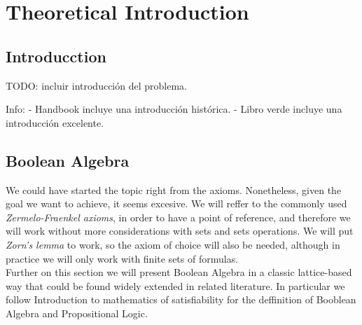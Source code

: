 
\chapter{Theoretical Introduction} %

\label{Chapter1} %


\newcommand{\keyword}[1]{\textbf{#1}}
\newcommand{\tabhead}[1]{\textbf{#1}}
\newcommand{\code}[1]{\texttt{#1}}
\newcommand{\file}[1]{\texttt{\bfseries#1}}
\newcommand{\option}[1]{\texttt{\itshape#1}}

\section{Introducction}

TODO: incluir introducción del problema.

Info:
- Handbook incluye una introducción histórica.
- Libro verde incluye una introducción excelente.



\section{Boolean Algebra}

We could have started the topic right from the axioms. Nonetheless, given the goal we want to achieve, it seems excesive. We will reffer to the commonly used \emph{Zermelo-Fraenkel axioms}, in order to have a point of reference, and therefore we will work without more considerations with sets and sets operations. We will put \emph{Zorn's lemma} to work, so the axiom of choice will also be needed, although in practice we will only work with finite sets of formulas.\\

Further on this section we will present Boolean Algebra in a classic lattice-based way that could be found widely extended in related literature. In particular we follow Introduction to mathematics of satisfiability\cite{marek2009introduction} for the deffinition of Booblean Algebra and Propositional Logic.

